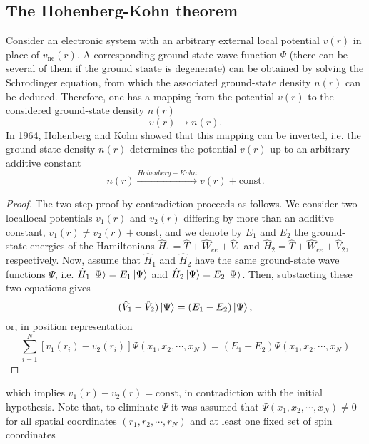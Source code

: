 \subsection{The Hohenberg-Kohn theorem}
Consider an electronic system with an arbitrary external local potential $v(r)$
in place of $v_{\mathrm{ne}}(r)$. A corresponding ground-state wave function
$\Psi$ (there can be several of them if the ground staate is degenerate) can be
obtained by solving the Schrodinger equation, from which the associated
ground-state density $n(r)$ can be deduced. Therefore, one has a mapping from
the potential $v(r)$ to the considered ground-state density $n(r)$
\begin{equation}
  v(r)\rightarrow n(r).
\end{equation}
In 1964, Hohenberg and Kohn showed that this mapping can be inverted, i.e. the
ground-state density $n(r)$ determines the potential $v(r)$ up to an arbitrary
additive constant
\begin{equation}
  \boxed{
  n(r)\xrightarrow{Hohenberg-Kohn} v(r) + \mathrm{const}.}
\end{equation}
\begin{proof}
  The two-step proof by contradiction proceeds as follows. We consider two
  locallocal potentials $v_1(r)$ and $v_2(r)$ differing by more than an
  additive constant, $v_1(r) \neq v_2(r) +\mathrm{const}$, and we denote by
  $E_1$ and $E_2$ the ground-state energies of the Hamiltonians $\hat{H}_1
  = \hat{T} + \hat{W}_{ee} + \hat{V}_1$ and $\hat{H}_2 = \hat{T} + \hat{W}_{ee}+
  \hat{V}_2$, respectively.
  Now, assume that $\hat{H}_1$ and $\hat{H}_2$ have the same ground-state wave
  functions $\Psi$, i.e. $\hat{H}_1\ket{\Psi} = E_1\ket{\Psi}$ and
  $\hat{H}_2\ket{\Psi} = E_2\ket{\Psi}$. Then, substacting these two equations
  gives
  \begin{equation}
    (\hat{V}_1 - \hat{V}_2)\ket{\Psi} = (E_1 - E_2)\ket{\Psi},
  \end{equation}
  or, in position representation
  \begin{equation}
    \sum_{i=1}^{N}\left[v_1(r_i) - v_2(r_i)\right]\Psi(x_1,x_2,\cdots,x_N)
  = \left(E_1 - E_2\right)\Psi(x_1,x_2,\cdots,x_N)
  \end{equation}
\end{proof}
which implies $v_1(r) - v_2(r) = \mathrm{const}$, in contradiction with the
initial hypothesis. Note that, to eliminate $\Psi$ it was assumed that 
$\Psi(x_1,x_2,\cdots,x_N)\neq 0$ for all spatial coordinates
$(r_1,r_2,\cdots,r_N)$ and at least one fixed set of spin coordinates
